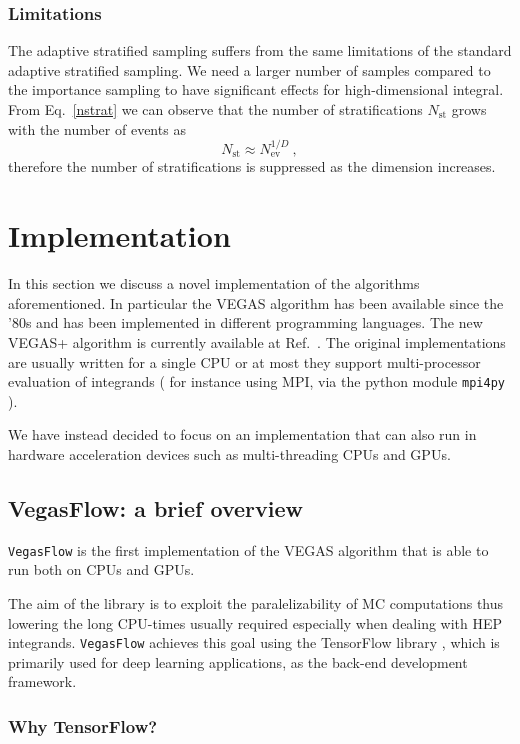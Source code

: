 \documentclass[../main/main.tex]{subfiles}
\begin{document}
\subsubsection{Limitations}
The adaptive stratified sampling suffers from the same limitations of the standard adaptive stratified sampling.
We need a larger number of samples compared to the importance sampling  to have significant effects for high-dimensional integral.
From Eq.~\ref{nstrat} we can observe that the number of stratifications $N_\text{st}$ grows with the number of events as 
\begin{equation}
	N_\text{st} \approx N_\text{ev}^{1/D} \ ,
\end{equation}
therefore the number of stratifications is suppressed as the dimension increases. 

\section{Implementation}
In this section we discuss a novel implementation of the algorithms aforementioned.
In particular the VEGAS algorithm has been available since the '80s and has been implemented in different programming languages.
The new VEGAS+ algorithm is currently available at Ref.~\cite{peter_lepage_2021_4746454}.
The original implementations are usually written for a single CPU or at most they support multi-processor evaluation of integrands ( for instance using
MPI, via the python module \texttt{mpi4py} \cite{peter_lepage_2021_4746454} ).

We have instead decided to focus on an implementation that can also run in hardware acceleration devices such as multi-threading CPUs and GPUs.

\subsection{VegasFlow: a brief overview}
\texttt{VegasFlow} \cite{vegasflow_package} is the first implementation of the VEGAS algorithm that is able to run both on CPUs and GPUs.
 
The aim of the library is to exploit the paralelizability of MC computations thus lowering the long CPU-times usually required especially when
dealing with HEP integrands.
 \texttt{VegasFlow} achieves this goal using the TensorFlow library \cite{tensorflow2015-whitepaper}, which is primarily used for deep learning applications, as the back-end development framework. 

\subsubsection{Why TensorFlow?}
\label{tensorflow}
\end{document}
